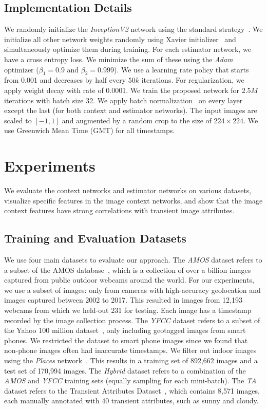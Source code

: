 \subsection{Implementation Details}

We randomly initialize the {\em InceptionV2} network using the
standard strategy~\cite{szegedy2016rethinking}.
We initialize all other network weights randomly using Xavier
initializer~\cite{glorot2010understanding} and
simultaneously optimize them during training. For each
estimator network, we have a cross entropy loss.  We minimize the sum
of these using the {\em Adam} optimizer \cite{kingma2014adam}
($\beta_1 = 0.9$ and $\beta_2 = 0.999$). We use a learning rate policy
that starts from 0.001 and decreases by half every $50k$ iterations.
For regularization, we apply weight decay with rate of 0.0001. We
train the proposed network for $2.5M$ iterations with batch size 32.
We apply batch
normalization~\cite{inception15} on every layer except the last (for
both context and estimator networks).  The input images are scaled to
$[-1,1]$ and augmented by a random crop to the size of $224 \times
224$. We use Greenwich Mean Time (GMT) for all timestamps.

\section{Experiments}

We evaluate the context networks and estimator networks on various
datasets, visualize specific features in the image context networks,
and show that the image context features have strong correlations with
transient image attributes.


\subsection{Training and Evaluation Datasets}

We use four main datasets to evaluate our approach.  The {\em AMOS}
dataset refers to a subset of the AMOS
database~\cite{jacobs07amos}, which is a collection of over a billion
images captured from public outdoor webcams around the world.  For our
experiments, we use a subset of images: only from cameras with
high-accuracy geolocation and images captured between 2002 to 2017.
This resulted in images from 12,193 webcams from which we held-out 231
for testing. Each image has a timestamp recorded by the image
collection process.  The {\em YFCC} dataset refers to a subset of
the Yahoo 100 million dataset~\cite{yfcc100m}, only including
geotagged images from smart phones.  We restricted the dataset to
smart phone images since we found that non-phone images often had
inaccurate timestamps.  We filter out indoor images using the {\em
Places} network~\cite{zhou2017places}. This results in a training set
of 892,662 images and a test set of 170,994 images.  The
{\em Hybrid} dataset refers to a combination of the {\em AMOS} and
{\em YFCC} training sets (equally sampling for each mini-batch).  The
{\em TA} dataset refers to the Transient Attributes
Dataset~\cite{laffont2014transient}, which contains 8,571 images, each
manually annotated with $40$ transient attributes, such as sunny and
cloudy.

